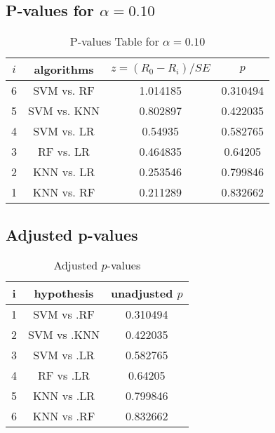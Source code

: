 \documentclass[a4paper,10pt]{article}
\begin{document}
\begin{landscape}
\subsection{P-values for $\alpha=0.10$}

\begin{table}[!htp]
\centering\scriptsize
\begin{tabular}{cccc}
$i$&algorithms&$z=(R_0 - R_i)/SE$&$p$\\
\hline6&SVM vs. RF&1.014185&0.310494\\
5&SVM vs. KNN&0.802897&0.422035\\
4&SVM vs. LR&0.54935&0.582765\\
3&RF vs. LR&0.464835&0.64205\\
2&KNN vs. LR&0.253546&0.799846\\
1&KNN vs. RF&0.211289&0.832662\\
\hline
\end{tabular}
\caption{P-values Table for $\alpha=0.10$}
\end{table}\pagebreak

\subsection{Adjusted p-values}

\begin{table}[!htp]
\centering\scriptsize
\begin{tabular}{ccc}
i&hypothesis&unadjusted $p$\\
\hline1&SVM vs .RF&0.310494\\
2&SVM vs .KNN&0.422035\\
3&SVM vs .LR&0.582765\\
4&RF vs .LR&0.64205\\
5&KNN vs .LR&0.799846\\
6&KNN vs .RF&0.832662\\
\hline
\end{tabular}
\caption{Adjusted $p$-values}
\end{table}

\end{landscape}
\end{document}
